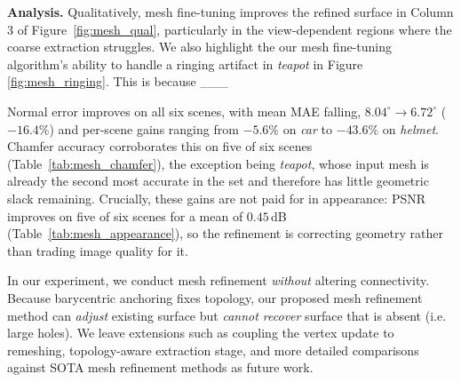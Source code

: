 
\textbf{Analysis.}
Qualitatively, mesh fine-tuning improves the refined surface in Column 3 of Figure~\ref{fig:mesh_qual}, particularly in the view-dependent regions where the coarse extraction struggles. We also highlight the our mesh fine-tuning algorithm's ability to handle a ringing artifact in \emph{teapot} in Figure \ref{fig:mesh_ringing}. This is because ___


Normal error improves on all six scenes, with mean
MAE falling, $8.04^\circ \rightarrow 6.72^\circ$ ($-16.4\%$) and per-scene gains
ranging from $-5.6\%$ on \textit{car} to $-43.6\%$ on \textit{helmet}.
Chamfer accuracy corroborates this on five of six scenes
(Table~\ref{tab:mesh_chamfer}), the exception being \textit{teapot}, whose input
mesh is already the second most accurate in the set and therefore has little
geometric slack remaining.
Crucially, these gains are not paid for in appearance: PSNR improves on five of
six scenes for a mean of $0.45$\,dB (Table~\ref{tab:mesh_appearance}), so the
refinement is correcting geometry rather than trading image quality for it.

In our experiment, we conduct mesh refinement \emph{without} altering connectivity. Because barycentric anchoring fixes topology, our proposed mesh refinement method can \emph{adjust} existing surface but \emph{cannot recover} surface that is absent (i.e. large holes). We leave extensions such as coupling the vertex update to remeshing, topology-aware extraction stage, and more detailed comparisons against SOTA mesh refinement methods as future work.